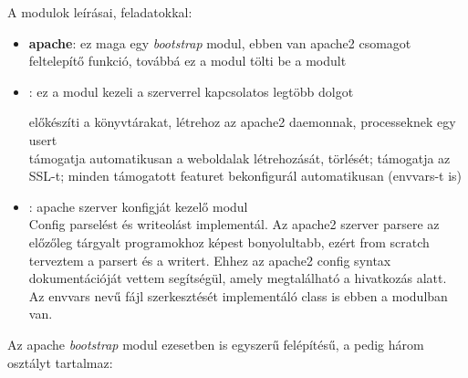 A modulok leírásai, feladatokkal:
\begin{itemize}
	\item \textbf{apache}: ez maga egy \textit{bootstrap} modul, ebben van apache2 csomagot feltelepítő funkció, továbbá ez a modul tölti be a \textit{} modult
	\item \textbf{}: ez a modul kezeli a szerverrel kapcsolatos legtöbb dolgot
	
	előkészíti a könyvtárakat, létrehoz az apache2 daemonnak, processeknek egy usert\\támogatja automatikusan a weboldalak létrehozását, törlését; támogatja az SSL-t; minden támogatott featuret bekonfigurál automatikusan (envvars-t is)

	\item \textbf{}: apache szerver konfigját kezelő modul\\Config parselést és writeolást implementál. Az apache2 szerver parsere az előzőleg tárgyalt programokhoz képest bonyolultabb, ezért from scratch terveztem a parsert és a writert. Ehhez az apache2 config syntax dokumentációját vettem segítségül, amely megtalálható a \cite{apache_configuring} hivatkozás alatt.
	\\Az envvars nevű fájl szerkesztését implementáló class is ebben a modulban van.
\end{itemize}

\begin{center}
	Az apache \textit{bootstrap} modul ezesetben is egyszerű felépítésű, a \textit{} pedig három osztályt tartalmaz:
	
	\hfill
\end{center}
	

